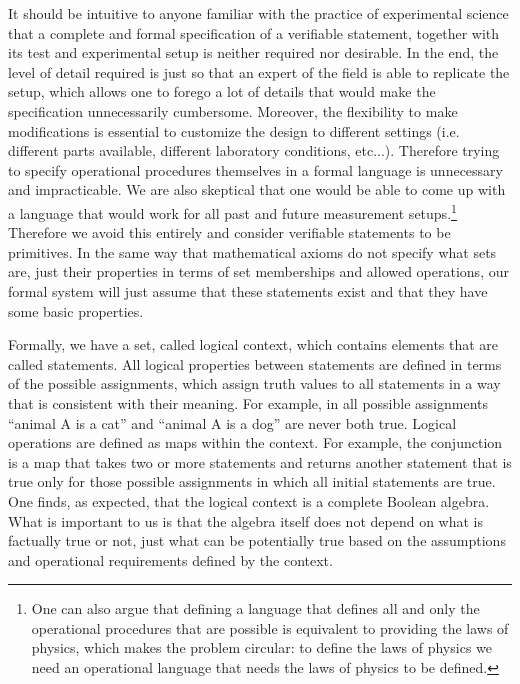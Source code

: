 \documentclass[10pt,twocolumn, nofootinbib]{revtex4-2}
\begin{document}
It should be intuitive to anyone familiar with the practice of experimental science that a complete and formal specification of a verifiable statement, together with its test and experimental setup is neither required nor desirable. In the end, the level of detail required is just so that an expert of the field is able to replicate the setup, which allows one to forego a lot of details that would make the specification unnecessarily cumbersome. Moreover, the flexibility to make modifications is essential to customize the design to different settings (i.e. different parts available, different laboratory conditions, etc...). Therefore trying to specify operational procedures themselves in a formal language is unnecessary and impracticable. We are also skeptical that one would be able to come up with a language that would work for all past and future measurement setups.\footnote{One can also argue that defining a language that defines all and only the operational procedures that are possible is equivalent to providing the laws of physics, which makes the problem circular: to define the laws of physics we need an operational language that needs the laws of physics to be defined.} Therefore we avoid this entirely and consider verifiable statements to be primitives. In the same way that mathematical axioms do not specify what sets are, just their properties in terms of set memberships and allowed operations, our formal system will just assume that these statements exist and that they have some basic properties.

Formally, we have a set, called logical context, which contains elements that are called statements. All logical properties between statements are defined in terms of the possible assignments, which assign truth values to all statements in a way that is consistent with their meaning. For example, in all possible assignments ``animal A is a cat'' and ``animal A is a dog'' are never both true. Logical operations are defined as maps within the context. For example, the conjunction is a map that takes two or more statements and returns another statement that is true only for those possible assignments in which all initial statements are true. One finds, as expected, that the logical context is a complete Boolean algebra. What is important to us is that the algebra itself does not depend on what is factually true or not, just what can be potentially true based on the assumptions and operational requirements defined by the context.
\end{document}
